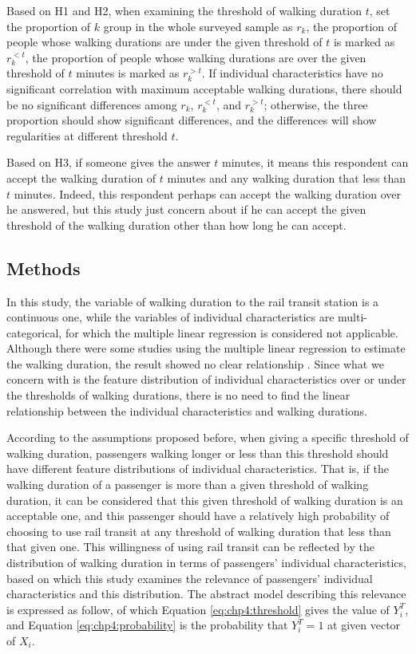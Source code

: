 Based on H1 and H2, when examining the threshold of walking duration $t$, set the proportion of $k$ group in the whole surveyed sample as $r_k$, the proportion of people whose walking durations are under the given threshold of $t$ is marked as $r_{k}^{<t}$, the proportion of people whose walking durations are over the given threshold of $t$ minutes is marked as $r_{k}^{>t}$. If individual characteristics have no significant correlation with maximum acceptable walking durations, there should be no significant differences among $r_k$, $r_{k}^{<t}$, and $r_{k}^{>t}$; otherwise, the three proportion should show significant differences, and the differences will show regularities at different threshold $t$.

Based on H3, if someone gives the answer $t$ minutes, it means this respondent can accept the walking duration of $t$ minutes and any walking duration that less than $t$ minutes. Indeed, this respondent perhaps can accept the walking duration over he answered, but this study just concern about if he can accept the given threshold of the walking duration other than how long he can accept.

%
\subsection{Methods}
In this study, the variable of walking duration to the rail transit station is a continuous one, while the variables of individual characteristics are multi-categorical, for which the multiple linear regression is considered not applicable. Although there were some studies using the multiple linear regression to estimate the walking duration, the result showed no clear relationship \cite{krygsman2004multimodal}. Since what we concern with is the feature distribution of individual characteristics over or under the thresholds of walking durations, there is no need to find the linear relationship between the individual characteristics and walking durations.

According to the assumptions proposed before, when giving a specific threshold of walking duration, passengers walking longer or less than this threshold should have different feature distributions of individual characteristics. That is, if the walking duration of a passenger is more than a given threshold of walking duration, it can be considered that this given threshold of walking duration is an acceptable one, and this passenger should have a relatively high probability of choosing to use rail transit at any threshold of walking duration that less than that given one. This willingness of using rail transit can be reflected by the distribution of walking duration in terms of passengers' individual characteristics, based on which this study examines the relevance of passengers' individual characteristics and this distribution. The abstract model describing this relevance is expressed as follow, of which Equation \ref{eq:chp4:threshold} gives the value of $Y^T_i$, and Equation \ref{eq:chp4:probability} is the probability that $Y^T_i=1$ at given vector of $X_i$.

